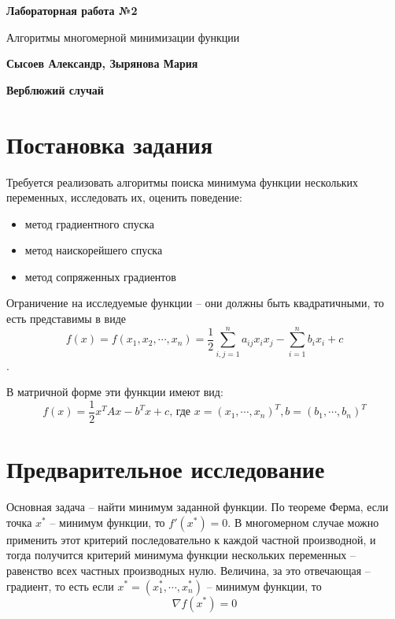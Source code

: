 \documentclass[12pt]{article}
\begin{document}
\begin{titlepage}
   \begin{center}
       \vspace*{1cm}

       \textbf{Лабораторная работа №2}

       \vspace{0.5cm}
        Алгоритмы многомерной минимизации функции
            
       \vspace{1.5cm}

       \textbf{Сысоев Александр, Зырянова Мария}
       
       \textbf{Верблюжий случай}

       \vfill
            
   \end{center}
\end{titlepage}



\section{Постановка задания}

Требуется реализовать алгоритмы поиска минимума функции нескольких переменных, исследовать их, оценить поведение:
\begin{itemize}
\item метод градиентного спуска
\item метод наискорейшего спуска
\item метод сопряженных градиентов
\end{itemize}

Ограничение на исследуемые функции -- они должны быть квадратичными, то есть представимы в виде
\[ f(x) = f(x_1, x_2, \cdots, x_n) = \frac{1}{2} \sum_{i, j = 1}^n a_{ij} x_i x_j - \sum_{i=1}^n b_i x_i + c\].

В матричной форме эти функции имеют вид:
\[ f(x) = \frac{1}{2} x^T Ax - b^Tx + c  \text{, где } x = (x_1, \cdots, x_n)^T, b = (b_1, \cdots, b_n)^T \]

\section{Предварительное исследование}

Основная задача -- найти минимум заданной функции. По теореме Ферма, если точка $x^*$ -- минимум функции, то $f'(x^*) = 0$. В многомерном случае можно применить этот критерий последовательно к каждой частной производной, и тогда получится критерий минимума функции нескольких переменных -- равенство всех частных производных нулю. Величина, за это отвечающая -- градиент, то есть если $x^* = (x_1^*, \cdots, x_n^*)$ -- минимум функции, то
\[ \nabla f(x^*) = 0 \]
\end{document}
